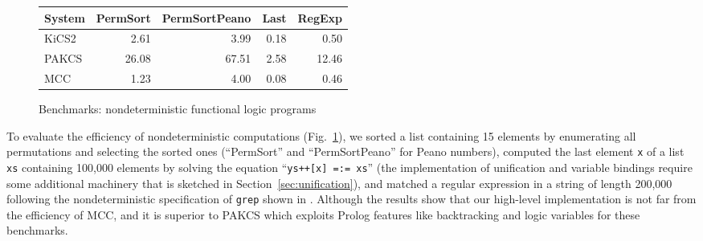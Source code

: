 \documentclass{llncs}
\newcommand{\code}[1]{\mbox{\small\texttt{#1}}}
\newcommand{\ccode}[1]{``\code{#1}''}
\begin{document}
\begin{figure}
\centering
\begin{tabular}{|@{~~}l@{~~}|*{4}{@{~~}r@{~~}|}}
\hline
System  & PermSort & PermSortPeano &  Last & RegExp \\\hline
KiCS2   &     2.61 &         3.99  &  0.18 &   0.50 \\
PAKCS   &    26.08 &        67.51  &  2.58 &  12.46 \\
MCC     &     1.23 &         4.00  &  0.08 &   0.46 \\
\hline
\end{tabular}
\caption{Benchmarks: nondeterministic functional logic programs}
 \label{fig:bench-nondet}
\end{figure}
%
To evaluate the efficiency of nondeterministic computations
(Fig.~\ref{fig:bench-nondet}),
we sorted a list containing 15 elements by enumerating all permutations
and selecting the sorted ones (``PermSort'' and ``PermSortPeano''
for Peano numbers),
computed the last element \code{x}
of a list \code{xs} containing 100,000 elements
by solving the equation \ccode{ys++[x] =:= xs}
(the implementation of unification and variable bindings
require some additional machinery that is sketched in
Section~\ref{sec:unification}),
and matched a regular expression in a string of length 200,000
following the nondeterministic specification of \code{grep} shown
in \cite{AntoyHanus10CACM}.
Although the results show that our high-level implementation is not far
from the efficiency of MCC,
and it is superior to PAKCS which exploits Prolog features
like backtracking and logic variables for these benchmarks.
\end{document}
